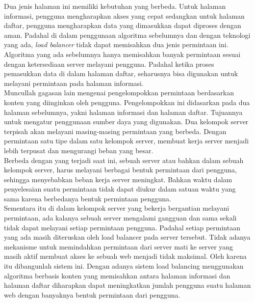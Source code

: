 \documentclass{ta-its}
\begin{document}
\indent Dua jenis halaman ini memiliki kebutuhan yang berbeda. Untuk halaman informasi, pengguna mengharapkan akses yang cepat sedangkan untuk halaman daftar, pengguna mengharapkan data yang dimasukkan dapat diproses dengan aman. Padahal di dalam penggunaan algoritma sebelumnya dan dengan teknologi yang ada, \emph{load balancer} tidak dapat memisahkan dua jenis permintaan ini. Algoritma yang ada sebelumnya hanya memisahkan banyak permintaan sesuai dengan ketersediaan server melayani pengguna. Padahal ketika proses pemasukkan data di dalam halaman daftar, seharusnya bisa digunakan untuk melayani permintaan pada halaman informasi. \\
\indent Muncullah gagasan lain mengenai pengelompokkan permintaan berdasarkan konten yang diinginkan oleh pengguna. Pengelompokkan ini didasarkan pada dua halaman sebelumnya, yakni halaman informasi dan halaman daftar. Tujuannya untuk mengatur penggunaan sumber daya yang digunakan. Dua kelompok server terpisah akan melayani masing-masing permintaan yang berbeda. Dengan permintaan satu tipe dalam satu kelompok server, membuat kerja server menjadi lebih terpusat dan mengurangi beban yang besar. \\
\indent Berbeda dengan yang terjadi saat ini, sebuah server atau bahkan dalam sebuah kelompok server, harus melayani berbagai bentuk permintaan dari pengguna, sehingga menyebabkan beban kerja server meningkat. Bahkan waktu dalam penyelesaian suatu permintaan tidak dapat diukur dalam satuan waktu yang sama karena berbedanya bentuk permintaan pengguna. \\
\indent Sementara itu di dalam kelompok server yang bekerja bergantian melayani permintaan, ada kalanya sebuah server mengalami gangguan dan sama sekali tidak dapat melayani setiap permintaan pengguna. Padahal setiap permintaan yang ada masih diteruskan oleh load balancer pada server tersebut. Tidak adanya mekanisme untuk memindahkan permintaan dari server mati ke server yang masih aktif membuat akses ke sebuah web menjadi tidak maksimal.
Oleh karena itu dibangunlah sistem ini. Dengan adanya sistem load balancing menggunakan algoritma berbasis konten yang memisahkan antara halaman informasi dan halaman daftar diharapkan dapat meningkatkan jumlah pengguna suatu halaman web dengan banyaknya bentuk permintaan dari pengguna.

            
\end{document}
